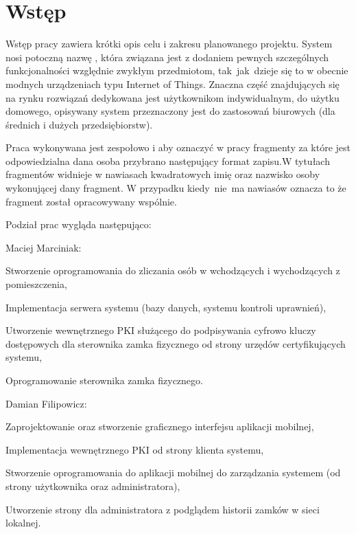 \newpage\section{Wstęp}\label{sec:wstep}
Wstęp pracy zawiera krótki opis celu i zakresu planowanego projektu. System nosi potoczną nazwę \NazwaSys, która związana jest z dodaniem  pewnych szczególnych funkcjonalności względnie zwykłym przedmiotom, tak~jak~dzieje się to w obecnie modnych urządzeniach\cite{porownanie zamkow} typu Internet of Things. Znaczna część znajdujących się na rynku rozwiązań dedykowana jest użytkownikom indywidualnym, do użytku domowego, opisywany system przeznaczony jest do zastosowań biurowych (dla średnich i dużych przedsiębiorstw).

Praca wykonywana jest zespołowo i aby oznaczyć w pracy fragmenty za które jest odpowiedzialna dana osoba przybrano następujący format zapisu.W tytułach fragmentów widnieje w nawiasach kwadratowych imię oraz nazwisko osoby wykonującej dany fragment. W przypadku kiedy~nie~ma nawiasów oznacza to że fragment został opracowywany wspólnie.

Podział prac wygląda następująco:
\begin{itemize*}
	\item Maciej Marciniak:
	\begin{enumerate*}
		\item Stworzenie oprogramowania do zliczania osób w wchodzących i wychodzących z pomieszczenia,
		\item Implementacja serwera systemu (bazy danych, systemu kontroli uprawnień),
		\item Utworzenie wewnętrznego PKI służącego do podpisywania cyfrowo kluczy dostępowych dla sterownika zamka fizycznego od strony urzędów certyfikujących systemu,
		\item Oprogramowanie sterownika zamka fizycznego.
	\end{enumerate*}
	\item Damian Filipowicz:
	\begin{enumerate*}
		\item Zaprojektowanie oraz stworzenie graficznego interfejsu aplikacji mobilnej,
		\item Implementacja wewnętrznego PKI od strony klienta systemu,
		\item Stworzenie oprogramowania do aplikacji mobilnej do zarządzania systemem (od strony użytkownika oraz administratora),
		\item Utworzenie strony dla administratora z podglądem historii zamków w sieci lokalnej.	
	\end{enumerate*}
\end{itemize*}

